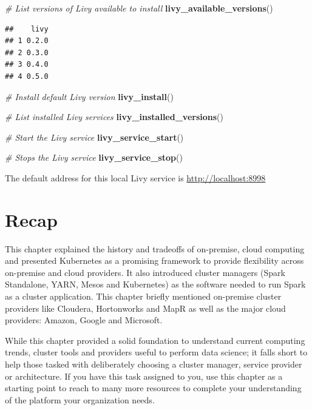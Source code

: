 \documentclass[]{book}
\newenvironment{Shaded}{\begin{snugshade}}{\end{snugshade}}
\newcommand{\CommentTok}[1]{\textcolor[rgb]{0.56,0.35,0.01}{\textit{#1}}}
\newcommand{\KeywordTok}[1]{\textcolor[rgb]{0.13,0.29,0.53}{\textbf{#1}}}
\newcommand{\NormalTok}[1]{#1}
\theoremstyle{definition}
\theoremstyle{definition}
\theoremstyle{definition}
\theoremstyle{remark}
\begin{document}
\begin{Shaded}
\begin{Highlighting}[]
\CommentTok{# List versions of Livy available to install}
\KeywordTok{livy_available_versions}\NormalTok{()}
\end{Highlighting}
\end{Shaded}

\begin{verbatim}
##    livy
## 1 0.2.0
## 2 0.3.0
## 3 0.4.0
## 4 0.5.0
\end{verbatim}

\begin{Shaded}
\begin{Highlighting}[]
\CommentTok{# Install default Livy version}
\KeywordTok{livy_install}\NormalTok{()}

\CommentTok{# List installed Livy services}
\KeywordTok{livy_installed_versions}\NormalTok{()}

\CommentTok{# Start the Livy service}
\KeywordTok{livy_service_start}\NormalTok{()}

\CommentTok{# Stops the Livy service}
\KeywordTok{livy_service_stop}\NormalTok{()}
\end{Highlighting}
\end{Shaded}

The default address for this local Livy service is
\url{http://localhost:8998}

\hypertarget{recap-1}{%
\section{Recap}\label{recap-1}}

This chapter explained the history and tradeoffs of on-premise, cloud
computing and presented Kubernetes as a promising framework to provide
flexibility across on-premise and cloud providers. It also introduced
cluster managers (Spark Standalone, YARN, Mesos and Kubernetes) as the
software needed to run Spark as a cluster application. This chapter
briefly mentioned on-premise cluster providers like Cloudera,
Hortonworks and MapR as well as the major cloud providers: Amazon,
Google and Microsoft.

While this chapter provided a solid foundation to understand current
computing trends, cluster tools and providers useful to perform data
science; it falls short to help those tasked with deliberately choosing
a cluster manager, service provider or architecture. If you have this
task assigned to you, use this chapter as a starting point to reach to
many more resources to complete your understanding of the platform your
organization needs.
\end{document}
